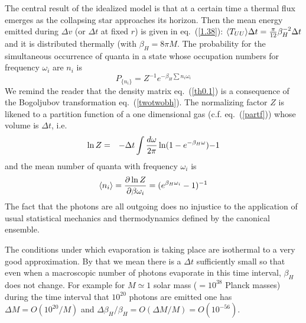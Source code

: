 \documentclass[12pt,oneside]{report}
\def\om{\omega	}
\begin{document}
The central result of the idealized model is that at a certain 
time 
a thermal flux emerges
as the collapsing star approaches its horizon. Then the mean energy emitted 
during $\Delta v$ (or $\Delta t$ at fixed $r$) is
given in eq.~(\ref{1.38}): $ \langle T_{UU} \rangle \Delta t  =
{\pi \over 12}\beta_H^{-2} \Delta t$ and it is distributed
thermally (with $ \beta_H  = 8\pi M$. 
The probability for the simultaneous occurrence of quanta in a
state whose occupation numbers for frequency $\omega_i$ are $n_i$ is
\begin{equation}
P_{\{ n_i\}} = Z^{-1} e^{- \beta_H \sum n_i \omega_i}
\label{th0.1}
\end{equation}
We remind the reader that the density matrix eq.~(\ref{th0.1}) is a 
consequence of the Bogoljubov transformation
 eq.~(\ref{twotwobh}).
The normalizing factor $Z$ is likened to a partition function of a one
dimensional gas (c.f. eq.~(\ref{partf}))
whose volume is $\Delta t$, i.e.
\begin{eqnarray}
\ln Z &=& -\Delta t \int {d \omega \over 2 \pi} \ln (1 - e^{-\beta_H
\omega})
{-1}
\label{th0.2}
\end{eqnarray}
and
the mean number of quanta with frequency $\om_i$ is
\begin{equation}
\langle n_i \rangle = {\partial \ln Z \over
\partial \beta \omega_i} =
(e^{\beta_H \omega_i} -1)^{-1}
\label{th0.3}
\end{equation}
The fact that the photons are all outgoing does no injustice to the
application of usual statistical mechanics and thermodynamics defined by
the canonical ensemble.

The conditions under which
evaporation is taking place are isothermal to a very good approximation.
By that we mean there is a $\Delta t$ sufficiently small so that even
when a macroscopic number of photons evaporate in this time interval,
$\beta_H$ does not change. For example for $M\simeq 1$ solar mass
($ = 10^{38}$ Planck masses) during the time interval
that $10^{20}$ photons are emitted one has $\Delta M = O(10^{20}/M)$
and $\Delta \beta_H / \beta_H =
O(\Delta M / M) = O(10^{-56})$.
\end{document}
